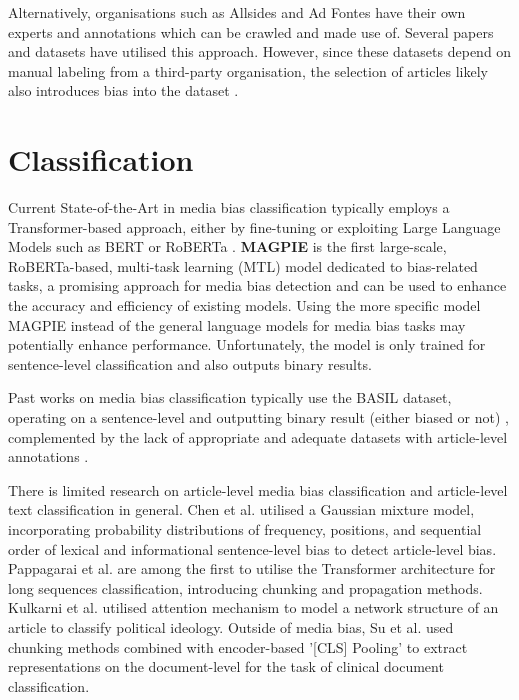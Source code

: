 Alternatively, organisations such as Allsides and Ad Fontes have their own experts and annotations which can be crawled and made use of. Several papers and datasets \cite{spinde-2023-bat,chen-2020-nlpcss,kulkarni-2018-multi-view} have utilised this approach. However, since these datasets depend on manual labeling from a third-party organisation, the selection of articles likely also introduces bias into the dataset \cite{spinde-2023-bat}.

\section{Classification}

Current State-of-the-Art in media bias classification typically employs a Transformer-based approach, either by fine-tuning or exploiting Large Language Models such as BERT \cite{devlin-2019-bert} or RoBERTa \cite{liu-2019-roberta}. \textbf{MAGPIE} \cite{horych-2024-magpie} is the first large-scale, RoBERTa-based, multi-task learning (MTL) model dedicated to bias-related tasks, a promising approach for media bias detection and can be used to enhance the accuracy and efficiency of existing models. Using the more specific model MAGPIE instead of the general language models for media bias tasks may potentially enhance performance. Unfortunately, the model is only trained for sentence-level classification and also outputs binary results.

Past works on media bias classification typically use the BASIL dataset, operating on a sentence-level and outputting binary result (either biased or not) \cite{maab-2023-lexical-bias-detection, maab-2023-target-aware, guo-2022-modeling, van-den-berg-2020-context,lee-2021-unifying,lei-2022-sentence,lei-2024-event-relation}, complemented by the lack of appropriate and adequate datasets with article-level annotations \cite{demidov-2023-political-bias-classification}.

There is limited research on article-level media bias classification and article-level text classification in general. Chen et al. \cite{chen-2020-detecting-media-bias-gaussian} utilised a Gaussian mixture model, incorporating probability distributions of frequency, positions, and sequential order of lexical and informational sentence-level bias to detect article-level bias. Pappagarai et al. \cite{pappagari-2019-hierarchical} are among the first to utilise the Transformer architecture for long sequences classification, introducing chunking and propagation methods. Kulkarni et al. \cite{kulkarni-2018-multi-view} utilised attention mechanism to model a network structure of an article to classify political ideology. Outside of media bias, Su et al. \cite{su-2021-classifying} used chunking methods combined with encoder-based '[CLS] Pooling' to extract representations on the document-level for the task of clinical document classification.

